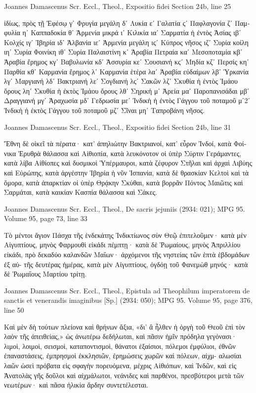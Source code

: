 \documentclass[12pt,letterpaper,twoside,final]{memoir}
\begin{document}
\begin{greek}
Joannes Damascenus Scr. Eccl., Theol., Expositio fidei 
Section 24b, line 25

ἰδίως, πρὸς τῇ Ἐφέσῳ γʹ Φρυγία μεγάλη δʹ Λυκία εʹ Γαλατία ϛʹ Παφλαγονία ζʹ 
Παμφυλία ηʹ Καππαδοκία θʹ Ἀρμενία μικρά ιʹ Κιλικία ιαʹ Σαρματία ἡ ἐντὸς Ἀσίας ιβʹ 
Κολχίς ιγʹ Ἰβηρία ιδʹ Ἀλβανία ιεʹ Ἀρμενία μεγάλη ιϛʹ Κύπρος νῆσος ιζʹ Συρία 
κοίλη ιηʹ Συρία Φοινίκη ιθʹ Συρία Παλαιστίνη κʹ Ἀραβία Πετραία καʹ Μεσοποταμία 
κβʹ Ἀραβία ἔρημος κγʹ Βαβυλωνία κδʹ Ἀσσυρία κεʹ Σουσιανή κϛʹ Μηδία κζʹ 
Περσίς κηʹ Παρθία κθʹ Καρμανία ἔρημος λʹ Καρμανία ἑτέρα λαʹ Ἀραβία εὐδαίμων λβʹ 
Ὑρκανία λγʹ Μαργιανή λδʹ Βακτριανή λεʹ Σογδιανή λϛʹ Σακῶν λζʹ Σκυθία ἡ ἐντὸς 
Ἰμάου ὄρους ληʹ Σκυθία ἡ ἐκτὸς Ἰμάου ὄρους λθʹ Σηρική μʹ Ἀρεία μαʹ Παροπανισάδαι 
μβʹ Δραγγιανή μγʹ Ἀραχωσία μδʹ Γεδρωσία μεʹ Ἰνδικὴ ἡ ἐντὸς Γάγγου τοῦ 
ποταμοῦ μʹ2ʹ Ἰνδικὴ ἡ ἐκτὸς Γάγγου τοῦ ποταμοῦ μζʹ Σῖναι μηʹ Ταπροβάνη νῆσος. 



Joannes Damascenus Scr. Eccl., Theol., Expositio fidei 
Section 24b, line 31

Ἔθνη δὲ οἰκεῖ τὰ πέρατα· κατ' ἀπηλιώτην Βακτριανοί, κατ' εὗρον Ἰνδοί, κατὰ 
Φοίνικα Ἐρυθρὰ θάλασσα καὶ Αἰθιοπία, κατὰ λευκόνοτον οἱ ὑπὲρ Σύρτιν Γεράμαντες, 
κατὰ λίβα Αἰθίοπες καὶ δυσμικοὶ Ὑπέρμαυροι, κατὰ ζέφυρον Στῆλαι καὶ ἀρχαὶ Λιβύης 
καὶ Εὐρώπης, κατὰ ἀργέστην Ἰβηρία ἡ νῦν Ἱσπανία, κατὰ δὲ θρασκίαν Κελτοὶ καὶ τὰ 
ὅμορα, κατὰ ἀπαρκτίαν οἱ ὑπὲρ Θρᾴκην Σκύθαι, κατὰ βορρᾶν Πόντος Μαιῶτις καὶ 
Σαρμάται, κατὰ καικίαν Κασπία θάλασσα καὶ Σάκες. 



Joannes Damascenus Scr. Eccl., Theol., De sacris jejuniis (2934: 021); MPG 95.
Volume 95, page 73, line 33

Τὸ μέντοι ἅγιον Πάσχα τῆς ἑνδεκάτης Ἰνδικτίωνος 
σὺν Θεῷ ἐπιτελοῦμεν· κατὰ μὲν Αἰγυπτίους, μηνὸς 
Φαρμουθὶ εἰκάδι πέμπτῃ· κατὰ δὲ Ῥωμαίους, μηνὸς 
Ἀπριλλίου εἰκάδι, πρὸ δεκαδύο καλανδῶν Μαΐων· 
ἀρχόμενοι τῆς νηστείας τῶν ἑπτὰ ἑβδομάδων ἐξ αὐ-
τῆς δευτέρας ἡμέρας, κατὰ μὲν Αἰγυπτίους, ὀγδόῃ 
τοῦ Φανεμὼθ μηνός· κατὰ δὲ Ῥωμαΐους Μαρτίου 
τρίτῃ. 



Joannes Damascenus Scr. Eccl., Theol., Epistula ad Theophilum imperatorem de sanctis et venerandis imaginibus [Sp.] (2934: 050); MPG 95.
Volume 95, page 376, line 50

                                       Καὶ μὲν δὴ τούτων 
πλείονα καὶ θρήνων ἄξια, «δι' ἃ ἦλθεν ἡ ὀργὴ τοῦ 
Θεοῦ ἐπὶ τὸν λαὸν τῆς ἀπειθείας,» ὡς ἀνωτέρω 
δεδήλωται, καὶ πᾶσιν ἡμῖν πρόδηλα γεγόνασι· λιμοὶ, 
λοιμοὶ, σεισμοὶ, καταποντισμοὶ, θάνατοι ἐξαίσιοι, 
πόλεμοι ἐμφύλιοι, ἐθνῶν ἐπαναστάσεις, ἐμπρησμοὶ 
ἐκκλησιῶν, ἐρημώσεις χωρῶν καὶ πόλεων, αἰχμ-
αλωσίαι λαῶν ὡσεὶ πρόβατα εἰς σφαγὴν πορευόμενα, 
μέχρις Αἰθιόπων, καὶ Ἰνδῶν, καὶ εἰς Ἀνατολὰς 
γῆς δοῦλοι καὶ αἰχμάλωτοι, νεάνιδες καὶ παρθένοι, 
πρεσβύτεροι μετὰ τῶν νεωτέρων· καὶ πᾶσα ἡλικία 
ἄρδην συντετέλεσται. 




\end{greek}
\end{document}
